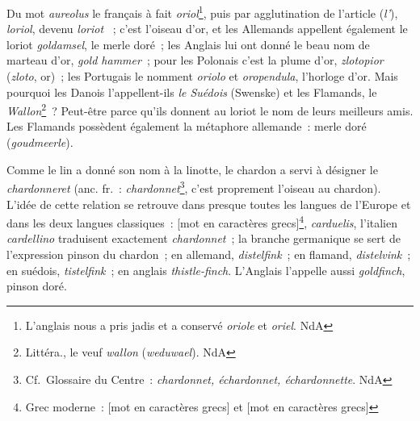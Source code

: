 \documentclass[french,twoside]{book} %
\def\mednobreak{\ifdim\lastskip<\medskipamount
  \removelastskip\nopagebreak\medskip\fi}
\newcommand{\labelblock}[1]{\medbreak{\noindent\color{rubric}\bfseries #1}\par\mednobreak}
\begin{document}
Du mot {\itshape aureolus} le français à fait {\itshape oriol}\footnote{ L’anglais nous a pris jadis et a conservé {\itshape oriole} et {\itshape oriel}. NdA}, puis par agglutination de l’article ({\itshape l’}), {\itshape loriol}, devenu {\itshape loriot}  ; c’est l’oiseau d’or, et les Allemands appellent également le loriot {\itshape goldamsel}, le merle doré ; les Anglais lui ont donné le beau nom de marteau d’or, {\itshape gold hammer} ; pour les Polonais c’est la plume d’or, {\itshape zlotopior} ({\itshape zloto}, or) ; les Portugais le nomment {\itshape oriolo} et {\itshape oropendula}, l’horloge d’or. Mais pourquoi les Danois l’appellent-ils {\itshape le Suédois} (Swenske) et les Flamands, le {\itshape Wallon}\footnote{ Littéra., le veuf {\itshape wallon} ({\itshape weduwael}). NdA} ? Peut-être parce qu’ils donnent au loriot le nom de leurs meilleurs amis. Les Flamands possèdent également la métaphore allemande : merle doré ({\itshape goudmeerle}).\par
Comme le lin a donné son nom à la linotte, le chardon a servi à désigner le {\itshape chardonneret} (anc. fr. : {\itshape chardonnet}\footnote{ Cf. Glossaire du Centre : {\itshape chardonnet, échardonnet, échardonnette}. NdA}, c’est proprement l’oiseau au chardon). L’idée de cette relation se retrouve dans presque toutes les langues de l’Europe et dans les deux langues classiques : [mot en caractères grecs]\footnote{ Grec moderne : [mot en caractères grecs] et [mot en caractères grecs]}, {\itshape carduelis}, l’italien {\itshape cardellino} traduisent exactement {\itshape chardonnet} ; la branche germanique se sert de l’expression pinson du chardon ; en allemand, {\itshape distelfink} ; en flamand, {\itshape distelvink} ; en suédois, {\itshape tistelfink} ; en anglais {\itshape thistle-finch}. L’Anglais l’appelle aussi {\itshape goldfinch}, pinson doré.\par

\labelblock{{\itshape Brochet. Bélier.}}
\end{document}
